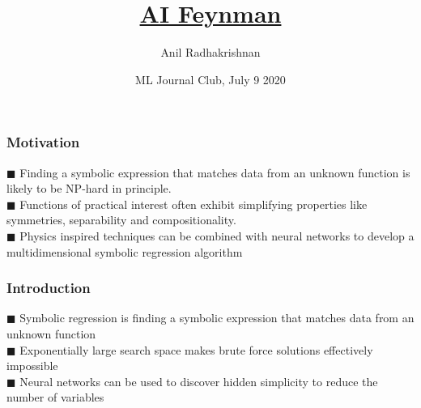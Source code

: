\documentclass[c,compress]{beamer}
\title{\href{https://arxiv.org/pdf/1905.11481.pdf}{AI Feynman}}
\author{Anil Radhakrishnan}
\institute{University of Illinois}
\date{ML Journal Club, July 9 2020 }
\def\bsq{\color{blue(pigment)} $\blacksquare$ \color{black}}
\begin{document}
\frame{\titlepage}

\begin{frame}\frametitle{Motivation} \label{Motiv}
\bsq Finding a symbolic expression that matches data from an unknown function is likely to be NP-hard in principle.\\
\bsq Functions of practical interest often exhibit simplifying properties like symmetries, separability and compositionality.\\
\bsq Physics inspired techniques can be combined with neural networks to develop a multidimensional symbolic regression algorithm
\end{frame} 

\begin{frame}\frametitle{Introduction} \label{intro}
\bsq Symbolic regression is finding a symbolic expression that matches data from an unknown function\\
\bsq Exponentially large search space makes brute force solutions effectively impossible\\
\bsq Neural networks can be used to discover hidden simplicity to reduce the number of variables
\end{frame} 
\end{document}
